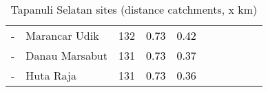 \begin{table}[ht]
\begin{tabular}{C{0.05\textwidth}C{0.15\textwidth}C{0.08\textwidth}C{0.08\textwidth}C{0.08\textwidth}C{0.08\textwidth}C{0.08\textwidth}C{0.08\textwidth}C{0.08\textwidth}C{0.08\textwidth}}
  {-} & Marancar Udik & 132 & \textcolor[HTML]{000000}{0.73} & \textcolor[HTML]{000000}{0.42} & \textcolor[HTML]{FFFFFF}{4} &  &  &  &  \\ 
  {-} & Danau Marsabut & 131 & \textcolor[HTML]{000000}{0.73} & \textcolor[HTML]{000000}{0.37} & \textcolor[HTML]{FFFFFF}{4} &  &  &  &  \\ 
  {-} & Huta Raja & 131 & \textcolor[HTML]{000000}{0.73} & \textcolor[HTML]{000000}{0.36} & \textcolor[HTML]{FFFFFF}{4} &  &  &  &  \\ 
  \end{tabular}
\endgroup
\caption{Tapanuli Selatan sites (distance catchments, x km)} 
\label{tab:tapanuli_selatan_dist}
\end{table}

